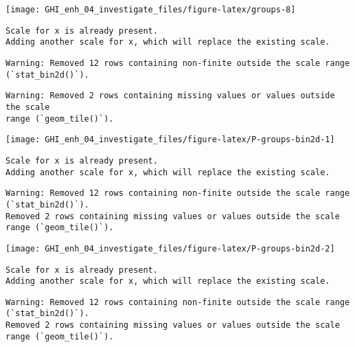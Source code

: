 \documentclass[
  10pt,
  a4paper,oneside]{article}
\begin{document}
\begin{center}\texttt{[image: GHI\_enh\_04\_investigate\_files/figure-latex/groups-8]} \end{center}

\begin{verbatim}
Scale for x is already present.
Adding another scale for x, which will replace the existing scale.
\end{verbatim}

\begin{verbatim}
Warning: Removed 12 rows containing non-finite outside the scale range
(`stat_bin2d()`).
\end{verbatim}

\begin{verbatim}
Warning: Removed 2 rows containing missing values or values outside the scale
range (`geom_tile()`).
\end{verbatim}

\begin{center}\texttt{[image: GHI\_enh\_04\_investigate\_files/figure-latex/P-groups-bin2d-1]} \end{center}

\begin{verbatim}
Scale for x is already present.
Adding another scale for x, which will replace the existing scale.
\end{verbatim}

\begin{verbatim}
Warning: Removed 12 rows containing non-finite outside the scale range (`stat_bin2d()`).
Removed 2 rows containing missing values or values outside the scale range (`geom_tile()`).
\end{verbatim}

\begin{center}\texttt{[image: GHI\_enh\_04\_investigate\_files/figure-latex/P-groups-bin2d-2]} \end{center}

\begin{verbatim}
Scale for x is already present.
Adding another scale for x, which will replace the existing scale.
\end{verbatim}

\begin{verbatim}
Warning: Removed 12 rows containing non-finite outside the scale range (`stat_bin2d()`).
Removed 2 rows containing missing values or values outside the scale range (`geom_tile()`).
\end{verbatim}
\end{document}

